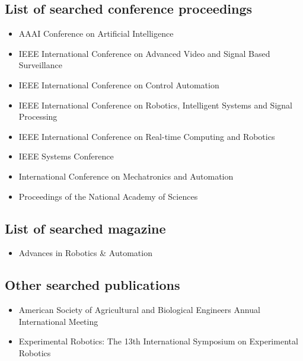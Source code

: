     \subsection{List of searched conference proceedings}
    \begin{itemize}
        \item AAAI Conference on Artificial Intelligence 
        \item IEEE International Conference on Advanced Video and Signal Based Surveillance
        \item IEEE International Conference on Control Automation 
        \item IEEE International Conference on Robotics, Intelligent Systems and Signal Processing
        \item IEEE International Conference on Real-time Computing and Robotics
        \item IEEE Systems Conference
        \item International Conference on Mechatronics and Automation
        \item Proceedings of the National Academy of Sciences
    \end{itemize}
    \subsection{List of searched magazine}
    \begin{itemize}
        \item Advances in Robotics {\&} Automation
    \end{itemize}
    \subsection{Other searched publications}
    \begin{itemize}
        \item American Society of Agricultural and Biological Engineers Annual International Meeting
        \item Experimental Robotics: The 13th International Symposium on Experimental Robotics
    \end{itemize}
